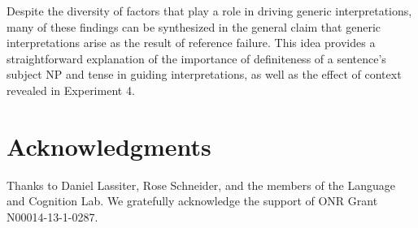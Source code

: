 \documentclass[10pt,letterpaper]{article}
\begin{document}
Despite the diversity of factors that play a role in driving generic interpretations, many of these findings can be synthesized in the general claim that generic interpretations arise as the result of reference failure. This idea provides a straightforward explanation of the importance of definiteness of a sentence's subject NP and tense in guiding interpretations, as well as the effect of context revealed in Experiment 4.

\section{Acknowledgments}

Thanks to Daniel Lassiter, Rose Schneider, and the members of the Language and Cognition Lab. We gratefully acknowledge the support of ONR Grant N00014-13-1-0287.



\setlength{\bibleftmargin}{.125in}
\setlength{\bibindent}{-\bibleftmargin}


\end{document}
